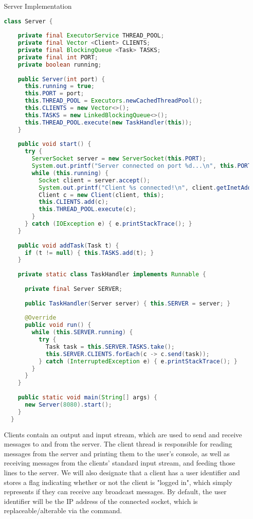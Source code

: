 \begin{cl}{Server Implementation}
\begin{lstlisting}[language=Java]
  class Server {
  
    private final ExecutorService THREAD_POOL;
    private final Vector <Client> CLIENTS;
    private final BlockingQueue <Task> TASKS;
    private final int PORT;
    private boolean running;
  
    public Server(int port) {
      this.running = true;
      this.PORT = port;
      this.THREAD_POOL = Executors.newCachedThreadPool();
      this.CLIENTS = new Vector<>();
      this.TASKS = new LinkedBlockingQueue<>();
      this.THREAD_POOL.execute(new TaskHandler(this));
    }
  
    public void start() {
      try {
        ServerSocket server = new ServerSocket(this.PORT);
        System.out.printf("Server connected on port %d...\n", this.PORT);
        while (this.running) {
          Socket client = server.accept();
          System.out.printf("Client %s connected!\n", client.getInetAddress());
          Client c = new Client(client, this);
          this.CLIENTS.add(c);
          this.THREAD_POOL.execute(c);
        }
      } catch (IOException e) { e.printStackTrace(); }
    }
  
    public void addTask(Task t) {
      if (t != null) { this.TASKS.add(t); }
    }
  
    private static class TaskHandler implements Runnable {
  
      private final Server SERVER;
  
      public TaskHandler(Server server) { this.SERVER = server; }
  
      @Override
      public void run() {
        while (this.SERVER.running) {
          try {
            Task task = this.SERVER.TASKS.take();
            this.SERVER.CLIENTS.forEach(c -> c.send(task));
          } catch (InterruptedException e) { e.printStackTrace(); }
        }
      }
    }
  
    public static void main(String[] args) {
      new Server(8080).start();
    }
  }
\end{lstlisting}
\end{cl}

Clients contain an output and input stream, which are used to send and receive messages to and from the server. The client thread is responsible for reading messages from the server and printing them to the user's console, as well as receiving messages from the clients' standard input stream, and feeding those lines to the server. We will also designate that a client has a user identifier and stores a flag indicating whether or not the client is "logged in", which simply represents if they can receive any broadcast messages. By default, the user identifier will be the IP address of the connected socket, which is replaceable/alterable via the  command.

